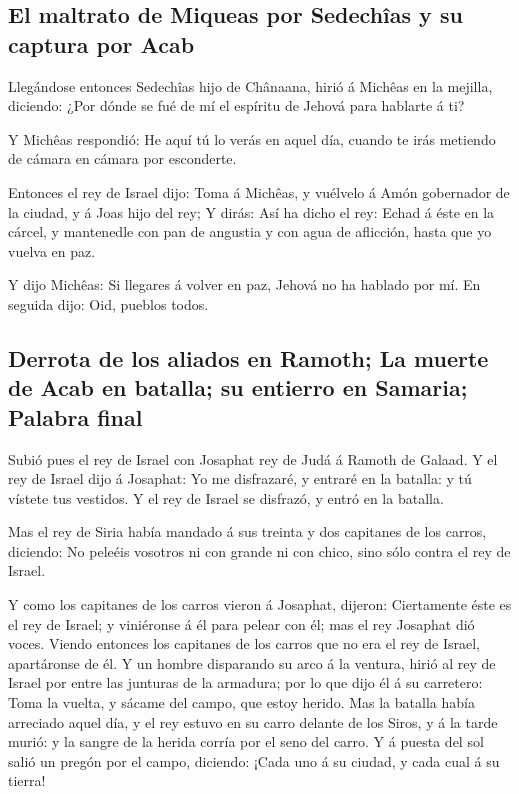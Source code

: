\hypertarget{el-maltrato-de-miqueas-por-sedechuxeeas-y-su-captura-por-acab}{%
\subsection{El maltrato de Miqueas por Sedechîas y su captura por
Acab}\label{el-maltrato-de-miqueas-por-sedechuxeeas-y-su-captura-por-acab}}

 Llegándose entonces Sedechîas hijo de Chânaana, hirió á
Michêas en la mejilla, diciendo: ¿Por dónde se fué de mí el espíritu de
Jehová para hablarte á ti?

 Y Michêas respondió: He aquí tú lo verás en aquel día,
cuando te irás metiendo de cámara en cámara por esconderte.

 Entonces el rey de Israel dijo: Toma á Michêas, y
vuélvelo á Amón gobernador de la ciudad, y á Joas hijo del rey;
 Y dirás: Así ha dicho el rey: Echad á éste en la cárcel,
y mantenedle con pan de angustia y con agua de aflicción, hasta que yo
vuelva en paz.

 Y dijo Michêas: Si llegares á volver en paz, Jehová no
ha hablado por mí. En seguida dijo: Oid, pueblos todos.

\hypertarget{derrota-de-los-aliados-en-ramoth-la-muerte-de-acab-en-batalla-su-entierro-en-samaria-palabra-final}{%
\subsection{Derrota de los aliados en Ramoth; La muerte de Acab en
batalla; su entierro en Samaria; Palabra
final}\label{derrota-de-los-aliados-en-ramoth-la-muerte-de-acab-en-batalla-su-entierro-en-samaria-palabra-final}}

 Subió pues el rey de Israel con Josaphat rey de Judá á
Ramoth de Galaad.  Y el rey de Israel dijo á Josaphat: Yo
me disfrazaré, y entraré en la batalla: y tú vístete tus vestidos. Y el
rey de Israel se disfrazó, y entró en la batalla.

 Mas el rey de Siria había mandado á sus treinta y dos
capitanes de los carros, diciendo: No peleéis vosotros ni con grande ni
con chico, sino sólo contra el rey de Israel.

 Y como los capitanes de los carros vieron á Josaphat,
dijeron: Ciertamente éste es el rey de Israel; y viniéronse á él para
pelear con él; mas el rey Josaphat dió voces.  Viendo
entonces los capitanes de los carros que no era el rey de Israel,
apartáronse de él.  Y un hombre disparando su arco á la
ventura, hirió al rey de Israel por entre las junturas de la armadura;
por lo que dijo él á su carretero: Toma la vuelta, y sácame del campo,
que estoy herido.  Mas la batalla había arreciado aquel
día, y el rey estuvo en su carro delante de los Siros, y á la tarde
murió: y la sangre de la herida corría por el seno del carro.
 Y á puesta del sol salió un pregón por el campo,
diciendo: ¡Cada uno á su ciudad, y cada cual á su tierra!

